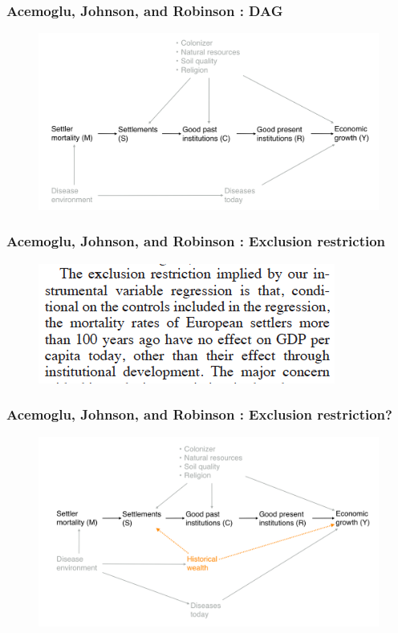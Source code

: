 \documentclass[12pt,english,dvipsnames,aspectratio=169,handout]{beamer}\usepackage[]{graphicx}\usepackage[]{xcolor}
\begin{document}
\begin{frame}
	\frametitle{Acemoglu, Johnson, and Robinson \citeyear{acemoglu_colonial_2001}: DAG}
	 \begin{figure} 
    \includegraphics[height=.8\textheight,keepaspectratio=true]{../04-figures/05/10-ajr_dag}
    \end{figure}
\end{frame}


\begin{frame}
	\frametitle{Acemoglu, Johnson, and Robinson \citeyear{acemoglu_colonial_2001}: Exclusion restriction}
	 \begin{figure} 
    \includegraphics[height=.5\textheight,keepaspectratio=true]{../04-figures/05/11-ajr_er}
    \end{figure}
\end{frame}


\begin{frame}
	\frametitle{Acemoglu, Johnson, and Robinson \citeyear{acemoglu_colonial_2001}: Exclusion restriction?}
	 \begin{figure} 
    \includegraphics[height=.9\textheight,keepaspectratio=true]{../04-figures/05/12-ajr_dag_crit}
    \end{figure}
\end{frame}
\end{document}
